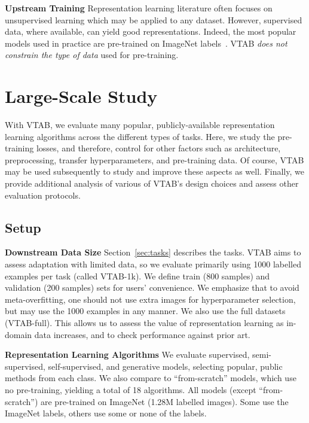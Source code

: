 \documentclass{article}
\newcommand{\myparagraph}[1]{\noindent\textbf{#1}\quad}
\newcommand{\imagenet}{ImageNet}
\begin{document}
\myparagraph{Upstream Training}
Representation learning literature often focuses on unsupervised learning which may be applied to any dataset. However, supervised data, where available, can yield good representations. Indeed, the most popular models used in practice are pre-trained on \imagenet{} labels~\citep[and refs therein]{huh2016makes}.
VTAB \emph{does not constrain the type of data} used for pre-training.



\section{Large-Scale Study\label{sec:experiments}}

With VTAB, we evaluate many popular, publicly-available representation learning algorithms across the different types of tasks.
Here, we study the pre-training losses, and therefore, control for other factors such as architecture, preprocessing, transfer hyperparameters, and pre-training data.
Of course, VTAB may be used subsequently to study and improve these aspects as well.
Finally, we provide additional analysis of various of VTAB's design choices and assess other evaluation protocols.


\subsection{Setup\label{sec:setup}}

\myparagraph{Downstream Data Size}
Section~\ref{sec:tasks} describes the tasks.
VTAB aims to assess adaptation with limited data, so we evaluate primarily using \num{1000} labelled examples per task (called VTAB-1k).
We define train (\num{800} samples) and validation (\num{200} samples) sets for users' convenience.
We emphasize that to avoid meta-overfitting, one should not use extra images for hyperparameter selection, but may use the \num{1000} examples in any manner.
We also use the full datasets (VTAB-full).
This allows us to assess the value of representation learning as in-domain data increases, and to check performance against prior art.

\myparagraph{Representation Learning Algorithms}
We evaluate supervised, semi-supervised, self-supervised, and generative models, selecting popular, public methods from each class.
We also compare to ``from-scratch'' models, which use no pre-training, yielding a total of 18 algorithms.
All models (except ``from-scratch'') are pre-trained on \imagenet{} (1.28M labelled images).
Some use the \imagenet{} labels, others use some or none of the labels.
\end{document}
